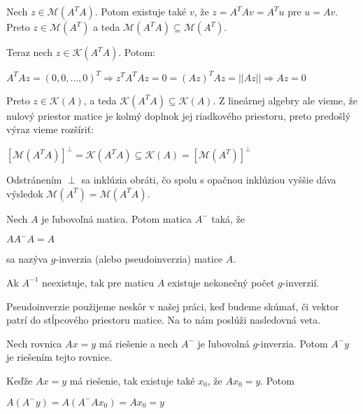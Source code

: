 \begin{dokaz}
Nech $z \in \mathcal{M}(A^T A)$. Potom existuje také $v$, že $z = A^T A v = A^T u$ pre $u = A v$.
Preto $z \in \mathcal{M}(A^T)$ a teda $\mathcal{M}(A^T A) \subseteq \mathcal{M}(A^T)$.

Teraz nech $z \in \mathcal{K}(A^T A)$. Potom:

\begin{center}
$
A^T A z = (0, 0, \ldots, 0)^T \Rightarrow z^T A^T A z = 0 = (Az)^T Az = ||Az|| \Rightarrow Az = 0
$
\end{center}

Preto $z \in \mathcal{K}(A)$, a teda $\mathcal{K}(A^T A) \subseteq \mathcal{K}(A)$.
Z lineárnej algebry ale vieme, že nulový priestor matice je kolmý doplnok jej riadkového priestoru,
preto predošlý výraz vieme rozšíriť:
\begin{center}
$
[\mathcal{M}(A^T A)]^{\perp} = \mathcal{K}(A^T A) \subseteq \mathcal{K}(A) = [\mathcal{M}(A^T)]^{\perp}
$
\end{center}

Odstránením $\perp$ sa inklúzia obráti, čo spolu s opačnou inklúziou vyššie dáva výsledok $\mathcal{M}(A^T) = \mathcal{M}(A^T A)$.
\end{dokaz}

\begin{defin}
Nech $A$ je ľubovoľná matica. Potom matica $A^-$ taká, že
\begin{center}
$A A^- A = A$
\end{center}
sa nazýva $g$-inverzia (alebo pseudoinverzia) matice $A$.
\end{defin}

\begin{com}
Ak $A^{-1}$ neexistuje, tak pre maticu $A$ existuje nekonečný počet $g$-inverzií.
\end{com}

Pseudoinverzie použijeme neskôr v našej práci, keď budeme skúmať, 
či vektor patrí do stĺpcového priestoru matice. Na to nám poslúži nasledovná veta.

\begin{theorem}
\label{veta3}
Nech rovnica $Ax = y$ má riešenie a nech $A^-$ je ľubovolná $g$-inverzia. Potom $A^- y$ je riešením tejto rovnice.
\end{theorem}

\begin{dokaz}
Keďže $Ax = y$ má riešenie, tak existuje také $x_0$, že $A x_0 = y$. Potom 
\begin{center}
$A (A^- y) = A(A^- A x_0) = A x_0 = y$
\end{center}
\end{dokaz}